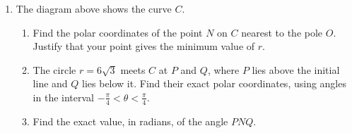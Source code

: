 \documentclass[leqno]{article}
\begin{document}
\begin{enumerate}[
  label=\textbf{\arabic*.},
  leftmargin=*,
  topsep=0pt,
  partopsep=0pt,
  parsep=0pt
]
\begin{enumerate}[label=\textbf{(\alph*)}]
\item The diagram above shows the curve $C$. \\
\begin{enumerate}[label=(\roman*)]
\item Find the polar coordinates of the point $N$ on $C$ nearest to the pole $O$. Justify that your point gives the minimum value of $r$.  \\
\item The circle $r=6\sqrt{3}$ meets $C$ at $P$ and $Q$, where $P$ lies above the initial line and $Q$ lies below it. Find their exact polar coordinates, using angles in the interval $-\frac{\pi}{4}<\theta<\frac{\pi}{4}$.  \\
\item Find the exact value, in radians, of the angle $PNQ$.  \\
\end{enumerate}
\end{enumerate}

\end{enumerate}
\end{document}
